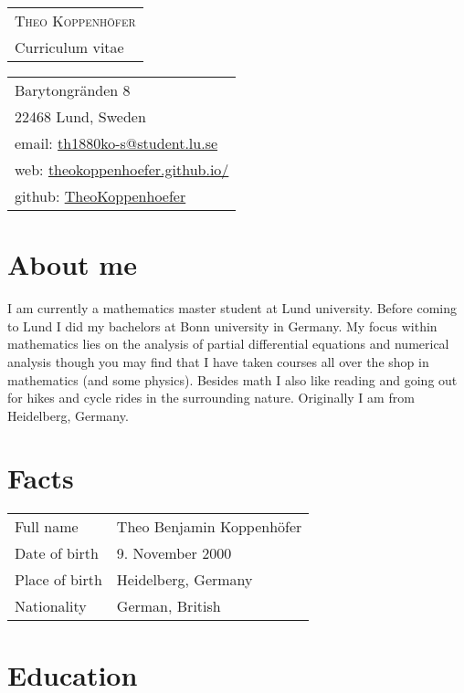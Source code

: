 \documentclass[11pt, letterpaper]{article}
\begin{document}
\begin{minipage}[t][1.25in][t]{.5\textwidth}
\begin{tabular}{@{}l@{}} %
\\
{\Huge\scshape Theo Koppenhöfer}\\[2.35ex]
{\large Curriculum vitae}
\end{tabular}
\end{minipage}
\hfill
\begin{minipage}[t][1.25in][t]{.4\textwidth}
\hfill
\begin{tabular}{l@{}}
Barytongränden 8\\
22468 Lund, Sweden\\[1ex]
email: \href{mailto:th1880ko-s@student.lu.se}{th1880ko-s@student.lu.se} \\
web: \href{https://theokoppenhoefer.github.io/}{theokoppenhoefer.github.io/} \\
github: \href{https://github.com/TheoKoppenhoefer}{TheoKoppenhoefer}
\end{tabular}
\end{minipage}

\section{About me}
I am currently a mathematics master student at Lund university. Before coming to Lund I did my bachelors at Bonn university in Germany. My focus within
mathematics lies on the analysis of partial differential equations and numerical analysis
though you may find that I have taken courses all over the shop in mathematics (and some physics).
Besides math I also like reading and going out for hikes and cycle rides in the surrounding nature.
Originally I am from Heidelberg, Germany.

\section{Facts}
\begin{tabularx}{\textwidth}{>{\raggedright\arraybackslash}p{45mm} X}
  Full name & Theo Benjamin Koppenhöfer \\[0.5ex]
  Date of birth & 9. November 2000 \\[0.5ex]
  Place of birth & Heidelberg, Germany \\[0.5ex]
  Nationality & German, British
\end{tabularx}\section{Education}
\end{document}
